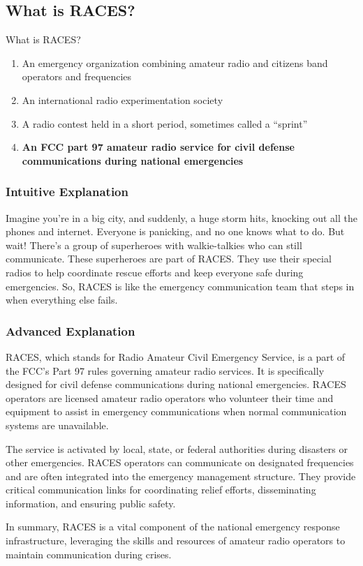 \subsection{What is RACES?}
\label{T2C04}

\begin{tcolorbox}[colback=gray!10!white,colframe=black!75!black,title=T2C04]
What is RACES?
\begin{enumerate}[label=\Alph*)]
    \item An emergency organization combining amateur radio and citizens band operators and frequencies
    \item An international radio experimentation society
    \item A radio contest held in a short period, sometimes called a “sprint”
    \item \textbf{An FCC part 97 amateur radio service for civil defense communications during national emergencies}
\end{enumerate}
\end{tcolorbox}

\subsubsection{Intuitive Explanation}
Imagine you're in a big city, and suddenly, a huge storm hits, knocking out all the phones and internet. Everyone is panicking, and no one knows what to do. But wait! There's a group of superheroes with walkie-talkies who can still communicate. These superheroes are part of RACES. They use their special radios to help coordinate rescue efforts and keep everyone safe during emergencies. So, RACES is like the emergency communication team that steps in when everything else fails.

\subsubsection{Advanced Explanation}
RACES, which stands for Radio Amateur Civil Emergency Service, is a part of the FCC's Part 97 rules governing amateur radio services. It is specifically designed for civil defense communications during national emergencies. RACES operators are licensed amateur radio operators who volunteer their time and equipment to assist in emergency communications when normal communication systems are unavailable.

The service is activated by local, state, or federal authorities during disasters or other emergencies. RACES operators can communicate on designated frequencies and are often integrated into the emergency management structure. They provide critical communication links for coordinating relief efforts, disseminating information, and ensuring public safety.

In summary, RACES is a vital component of the national emergency response infrastructure, leveraging the skills and resources of amateur radio operators to maintain communication during crises.


